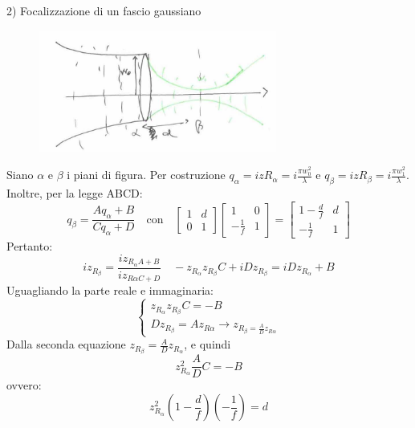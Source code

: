 \documentclass{book}
\def \l {\lambda}
\theoremstyle{remark}
\begin{document}
2) Focalizzazione di un fascio gaussiano
\begin{figure}[H]
\centering
\includegraphics[height=4cm]{images/3}
\end{figure}
Siano $\alpha$ e $\beta$ i piani di figura. Per costruzione $q_\alpha = izR_\alpha =i\frac{\pi w_0^2}{\l}$ e $q_\beta = izR_\beta = i\frac{\pi w_1^2}{\l}$.
Inoltre, per la legge ABCD:
\begin{equation*}
q_\beta = \frac{Aq_\alpha + B}{Cq_\alpha + D} \quad \text{con} \quad
\begin{bmatrix}
1	&	d\\
0	&	1
\end{bmatrix} \begin{bmatrix}
1	&	0\\
-\frac{1}{f}	&	1
\end{bmatrix}
=
\begin{bmatrix}
1-\frac{d}{f}	&	d\\
-\frac{1}{f}	&	1
\end{bmatrix}
\end{equation*}
Pertanto:
\begin{equation*}
iz_{R_\beta} = \frac{iz_{R_\alpha A + B}}{iz_{R\alpha C + D}}\quad -z_{R_\alpha} z_{R_\beta} C +iDz_{R_\beta} = iDz_{R_\alpha} + B
\end{equation*}
Uguagliando la parte reale e immaginaria:
\begin{equation*}
\begin{cases}
z_{R_\alpha} z_{R_\beta} C = -B\\
D z_{R_\beta} = A z_{R\alpha} \rightarrow z_{R_\beta = \frac{A}{D} z_{R\alpha}}
\end{cases}
\end{equation*}
Dalla seconda equazione $z_{R_\beta} = \frac{A}{D} z_{R_\alpha}$, e quindi
\begin{equation*}
z_{R_\alpha}^2 \frac{A}{D} C = -B
\end{equation*}
ovvero:
\begin{equation*}
z_{R_\alpha}^2 \left(1 - \frac{d}{f}\right) \left(-\frac{1}{f}\right) = d
\end{equation*}
\end{document}
